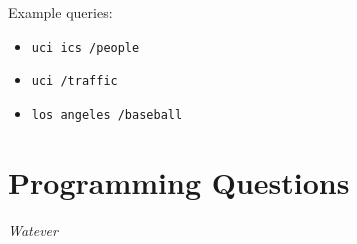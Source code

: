 \documentclass[a4paper,11pt,oneside]{book}
\begin{document}
\begin{enumerate}
	Example queries:
	\begin{itemize}
		\item \texttt{uci ics /people}
		\item \texttt{uci /traffic}
		\item \texttt{los angeles /baseball}
	\end{itemize}
 \end {enumerate}
\chapter{Programming Questions}

\pagebreak
\begin{thebibliography}{XXX}
 {\it Watever}


\end{thebibliography}
\end{document}

